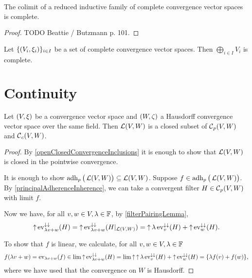 \begin{proposition}
The colimit of a reduced inductive family of complete convergence vector spaces is complete.
\end{proposition}
\begin{proof}
TODO Beattie / Butzmann p. 101.
\end{proof}
\begin{corollary}
Let $\{\left( V_i, \xi_i \right)\}_{i\in I}$ be a set of complete convergence vector spaces. Then $\bigoplus_{i\in I}V_i$ is complete.
\end{corollary}

\section{Continuity}

\begin{lemma} \label{continuousLinearFunctionsClosedSubset}
Let $\left( V, \xi \right)$ be a convergence vector space and $\left( W, \zeta \right)$ a Hausdorff convergence vector space over the same field. Then $\operatorname{\mathcal{L}}(V,W)$ is a closed subset of $\operatorname{\mathcal{C}}_p(V,W)$ and $\operatorname{\mathcal{C}}_c(V,W)$.
\end{lemma}
\begin{proof}
By \ref{openClosedConvergenceInclusions} it is enough to show that $\operatorname{\mathcal{L}}(V,W)$ is closed in the pointwise convergence.

It is enough to show $\operatorname{adh}_p\big(\operatorname{\mathcal{L}}(V,W)\big) \subseteq \operatorname{\mathcal{L}}(V,W)$. Suppose $f\in \operatorname{adh}_p\big(\operatorname{\mathcal{L}}(V,W)\big)$.  By \ref{principalAdherenceInherence}, we can take a convergent filter $H\in \operatorname{\mathcal{C}}_p(V,W)$ with limit $f$. 

Now we have, for all $v,w\in V, \lambda \in \mathbb{F}$, by \ref{filterPairingLemma},
\[ \operatorname{\uparrow}\operatorname{ev}_{\lambda v+w}^{\downarrow\downarrow}(H) = \operatorname{\uparrow}\operatorname{ev}_{\lambda v+w}^{\downarrow\downarrow}(H|_{\operatorname{\mathcal{L}}(V,W)}) = \operatorname{\uparrow}\lambda\operatorname{ev}_{v}^{\downarrow\downarrow}(H) + \operatorname{\uparrow}\operatorname{ev}_{w}^{\downarrow\downarrow}(H). \] 

To show that $f$ is linear, we calculate, for all $v,w\in V, \lambda \in \mathbb{F}$
\[ f(\lambda v + w) = \operatorname{ev}_{\lambda v+w}(f) \in \lim\operatorname{\uparrow}\operatorname{ev}_{\lambda v+w}^{\downarrow\downarrow}(H) = \lim\operatorname{\uparrow} \operatorname{\uparrow}\lambda\operatorname{ev}_{v}^{\downarrow\downarrow}(H) + \operatorname{\uparrow}\operatorname{ev}_{w}^{\downarrow\downarrow}(H) = \{\lambda f(v) + f(w)\},  \]
where we have used that the convergence on $W$ is Hausdorff.
\end{proof}

